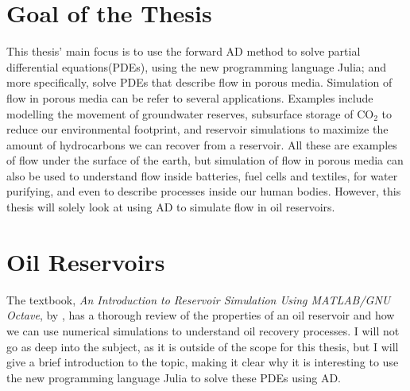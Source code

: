 \section{Goal of the Thesis}
This thesis' main focus is to use the forward AD method to solve partial differential equations(PDEs), using the new programming language Julia; and more specifically, solve PDEs that describe flow in porous media. Simulation of flow in porous media can be refer to several applications. Examples include modelling the movement of groundwater reserves, subsurface storage of CO$_2$ to reduce our environmental footprint, and reservoir simulations to maximize the amount of hydrocarbons we can recover from a reservoir. All these are examples of flow under the surface of the earth, but simulation of flow in porous media can also be used to understand flow inside batteries, fuel cells and textiles, for water purifying, and even to describe processes inside our human bodies. However, this thesis will solely look at using AD to simulate flow in oil reservoirs.

\section{Oil Reservoirs}
\label{sec:OilReservoirs}
The textbook, \textit{An Introduction to Reservoir Simulation Using MATLAB/GNU Octave}, by \emph{\citet{lieMrstUrl}}, has a thorough review of the properties of an oil reservoir and how we can use numerical simulations to understand oil recovery processes. I will not go as deep into the subject, as it is outside of the scope for this thesis, but I will give a brief introduction to the topic, making it clear why it is interesting to use the new programming language Julia to solve these PDEs using AD.


